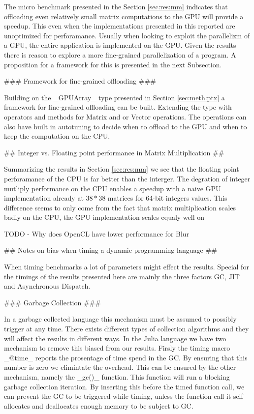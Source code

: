 \begin{markdown}
The micro benchmark presented in the Section \ref{sec:res:mm}
indicates that offloading even relatively small matrix computations to
the GPU will provide a speedup. This even when the implementations
presented in this reported are unoptimized for perforamance. Usually
when looking to exploit the parallelizm of a GPU, the entire
application is implemented on the GPU. Given the results there is
reason to explore a more fine-grained parallelization of a program. A
proposition for a framework for this is presented in the next
Subsection.

### Framework for fine-grained offloading ###

Building on the _GPUArray_ type presented in Section
\ref{sec:meth:ptx} a framework for fine-grained offloading can be
built. Extending the type with operators and methods for Matrix and or
Vector operations. The operations can also have built in autotuning to
decide when to offload to the GPU and when to keep the computation
on the CPU.

## Integer vs. Floating point performance in Matrix Multiplication ##

Summarizing the results in Section \ref{sec:res:mm} we see that the
floating point perforamance of the CPU is far better than the
interger. The degration of integer mutliply performance on the CPU
enables a speedup with a naive GPU implementation already at $38*38$
matrices for 64-bit integers values. This difference seems to only
come from the fact that matrix multiplication scales badly on the CPU,
the GPU implementation scales equaly well on 

TODO
- Why does OpenCL have lower performance for Blur


## Notes on bias when timing a dynamic programming language ##

When timing benchmarks a lot of parameters might effect the
results. Special for the timings of the results presented here are
mainly the three factors \gls{GC}, \gls{JIT} and Asynchronous
Dispatch.

### Garbage Collection ###

In a garbage collected language this mechanism must be assumed to
possibly trigger at any time. There exists different types of
collection algorithms and they will affect the results in different
ways. In the Julia language we have two mechanism to remove this
biased from our results. Firsly the timing macro _@time_ reports the
prosentage of time spend in the \gls{GC}. By ensuring that this number
is zero we elimintate the overhead. This can be ensured by the other
mechanism, namely the _gc()_ function. This function will run a
blocking garbage collection iteration. By inserting this before the
timed function call, we can prevent the \gls{GC} to be triggered while
timing, unless the function call it self allocates and deallocates
enough memory to be subject to \gls{GC}.



\end{markdown}
